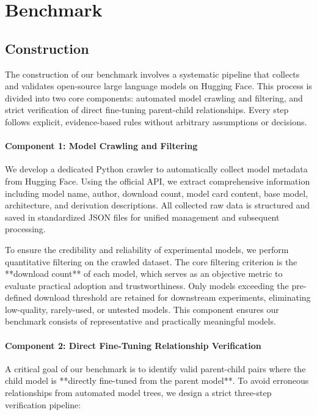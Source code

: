 \section{Benchmark}

\subsection{Construction}

The construction of our benchmark involves a systematic pipeline that collects and validates open-source large language models on Hugging Face. This process is divided into two core components: automated model crawling and filtering, and strict verification of direct fine-tuning parent-child relationships. Every step follows explicit, evidence-based rules without arbitrary assumptions or decisions.

\paragraph{Component 1: Model Crawling and Filtering}
We develop a dedicated Python crawler to automatically collect model metadata from Hugging Face. Using the official API, we extract comprehensive information including model name, author, download count, model card content, base model, architecture, and derivation descriptions. All collected raw data is structured and saved in standardized JSON files for unified management and subsequent processing.

To ensure the credibility and reliability of experimental models, we perform quantitative filtering on the crawled dataset. The core filtering criterion is the **download count** of each model, which serves as an objective metric to evaluate practical adoption and trustworthiness. Only models exceeding the pre-defined download threshold are retained for downstream experiments, eliminating low-quality, rarely-used, or untested models. This component ensures our benchmark consists of representative and practically meaningful models.

\paragraph{Component 2: Direct Fine-Tuning Relationship Verification}
A critical goal of our benchmark is to identify valid parent-child pairs where the child model is **directly fine-tuned from the parent model**. To avoid erroneous relationships from automated model trees, we design a strict three-step verification pipeline:

